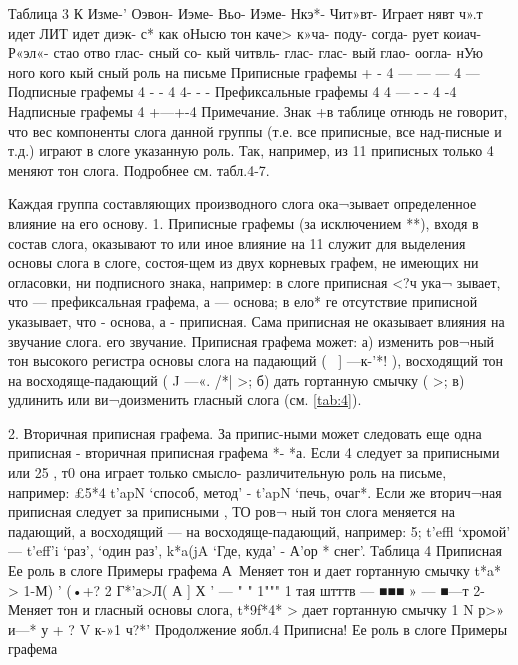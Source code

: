 Таблица 3
К
Изме-'	Оэвон-	Иэме-	Вьо-	Иэме-	Нкэ*-	Чит»вт-	Играет
нявт	ч».т	идет	ЛИТ	идет	диэк-	с* как	оНысю
тон	каче>	к»ча-	поду-	согда-	рует	коиач-	Р«эл«-
стао	отво	глас-	сный	со-	кый	читвль-
глас-	глас-	вый	глао-	оогла-	нУю
ного кого	кый сный роль на
письме
Приписные графемы +	-	4	—	—	—	4	—
Подписные графемы 4	-	-	4	4-	-	-
Префиксальные
графемы	4	4	—	-	-	4	-4
Надписные графемы 4	+---+-4
Примечание. Знак +в таблице отнюдь не говорит, что вес компоненты слога данной группы (т.е. все приписные, все над-писные и т.д.) играют в слоге указанную роль. Так, например, из 11 приписных только 4 меняют тон слога. Подробнее см. табл.4-7.

Каждая группа составляющих производного слога ока¬зывает определенное влияние на его основу.
1.	Приписные графемы (за исключением **), входя в состав слога, оказывают то или иное влияние на
11	служит для выделения основы слога в слоге, состоя-щем из двух корневых графем, не имеющих ни огласовки, ни подписного знака, например: в слоге	приписная <?ч ука¬
зывает, что   — префиксальная графема, а — основа; в ело* ге отсутствие приписной   указывает, что   - основа, а   - приписная. Сама приписная не оказывает влияния на звучание слога.
его звучание. Приписная графема может: а) изменить ров¬ный тон высокого регистра основы слога на падающий
( ~] —к-'*! ), восходящий тон на восходяще-падающий ( J —«. /*| >; б) дать гортанную смычку (   >; в) удлинить или ви¬доизменить гласный слога (см. \ref{tab:4}).

2.	Вторичная приписная графема. За припис-ными	может следовать еще одна приписная -
вторичная приписная графема *-	*а. Если  4 следует за
приписными или 25 , т0 она играет только смысло- различительную роль на письме, например:  £5*4 t'apN
‘способ, метод’ - t’apN ‘печь, очаг*. Если же вторич¬ная приписная следует за приписными	, ТО ров¬
ный тон слога меняется на падающий, а восходящий — на восходяще-падающий, например:  5; t’effl ‘хромой’ — t'eff'i ‘раз’, ‘один раз’,	k*a(jA ‘Где, куда’ -
А’ор * снег’.
Таблица 4
Приписная	Ее роль в слоге	Примеры
графема
А\ Меняет тон и дает гортанную смычку	t*a*  
>	1-М)	’
(•+?	2 Г*’а>Л(
А	]	Х '
—	" " 1"""	1 тая штттв — ■■■	» —	■—т
  2- Меняет тон и гласный основы слога,	t*9f*4*
>	дает гортанную смычку
1 N  
р>»
и—* у + ?	V
к-»1	ч?*'
Продолжение яобл.4
Приписна!	Ее роль в слоге	Примеры
графема

